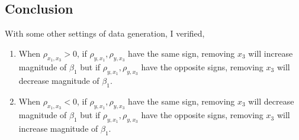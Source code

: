 \subsection{Conclusion}
With some other settings of data generation, I verified,
\begin{enumerate}
    \item When $\rho_{x_1 , x_3} > 0$, if $\rho_{y , x_1} , \rho_{y , x_3}$ have the same sign, removing $x_3$ will increase magnitude of $\beta_1$ but if $\rho_{y , x_1} , \rho_{y , x_3}$ have the opposite signs, removing $x_3$ will decrease magnitude of $\beta_1$.

    \item When $\rho_{x_1 , x_3} < 0$, if $\rho_{y , x_1} , \rho_{y , x_3}$ have the same sign, removing $x_3$ will decrease magnitude of $\beta_1$ but if $\rho_{y , x_1} , \rho_{y , x_3}$ have the opposite signs, removing $x_3$ will increase magnitude of $\beta_1$.
\end{enumerate}

